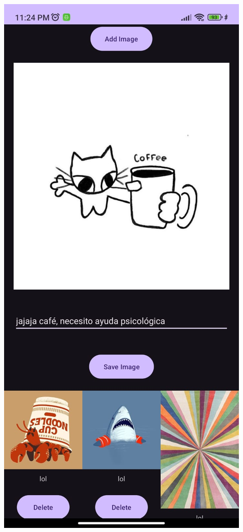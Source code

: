 \documentclass[conference]{IEEEtran}
\begin{document}
{\includegraphics[width=\breite\linewidth]{figura1a.jpeg}}\\
\end{document}
